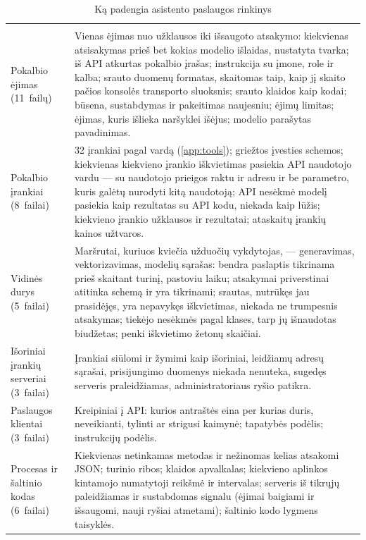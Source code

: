 \begin{xltabular}{\textwidth}{@{}L{31mm}Y@{}}
\caption{Ką padengia asistento paslaugos rinkinys}\label{tab:testing:assistant}\\
\toprule
{} &  \\
\midrule
\endfirsthead
\toprule
{} &  \\
\midrule
\endhead
\bottomrule
\endlastfoot
Pokalbio ėjimas (11~failų) & Vienas ėjimas nuo užklausos iki išsaugoto atsakymo: kiekvienas
atsisakymas prieš bet kokias modelio išlaidas, nustatyta tvarka; iš API atkurtas pokalbio
įrašas; instrukcija su įmone, role ir kalba; srauto duomenų formatas, skaitomas taip, kaip jį
skaito pačios konsolės transporto sluoksnis; srauto klaidos kaip kodai; būsena, sustabdymas ir
pakeitimas naujesniu; ėjimų limitas; ėjimas, kuris išlieka naršyklei išėjus; modelio parašytas
pavadinimas. \\
Pokalbio įrankiai (8~failai) & 32 įrankiai pagal vardą (\cref{app:tools}); griežtos įvesties
schemos; kiekvienas kiekvieno įrankio iškvietimas pasiekia API naudotojo vardu --- su naudotojo
prieigos raktu ir adresu ir be parametro, kuris galėtų nurodyti kitą naudotoją; API nesėkmė
modelį pasiekia kaip rezultatas su API kodu, niekada kaip lūžis; kiekvieno įrankio užklausos ir
rezultatai; ataskaitų įrankių kainos užtvaros. \\
Vidinės durys (5~failai) & Maršrutai, kuriuos kviečia užduočių vykdytojas, --- generavimas,
vektorizavimas, modelių sąrašas: bendra paslaptis tikrinama prieš skaitant turinį, pastoviu
laiku; atsakymai priverstinai atitinka schemą ir yra tikrinami; srautas, nutrūkęs jau prasidėjęs,
yra nepavykęs iškvietimas, niekada ne trumpesnis atsakymas; tiekėjo nesėkmės pagal klases, tarp
jų išnaudotas biudžetas; penki iškvietimo žetonų skaičiai. \\
Išoriniai įrankių serveriai (3~failai) & Įrankiai siūlomi ir žymimi kaip išoriniai,
leidžiamų adresų sąrašai, prisijungimo duomenys niekada nenuteka, sugedęs serveris praleidžiamas,
administratoriaus ryšio patikra. \\
Paslaugos klientai (3~failai) & Kreipiniai į API: kurios antraštės eina per kurias duris,
neveikianti, tylinti ar strigusi kaimynė; tapatybės podėlis; instrukcijų podėlis. \\
Procesas ir šaltinio kodas (6~failai) & Kiekvienas netinkamas metodas ir nežinomas kelias
atsakomi JSON; turinio ribos; klaidos apvalkalas; kiekvieno aplinkos kintamojo numatytoji
reikšmė ir intervalas; serveris iš tikrųjų paleidžiamas ir sustabdomas signalu (ėjimai baigiami
ir išsaugomi, nauji ryšiai atmetami); šaltinio kodo lygmens taisyklės. \\
\end{xltabular}

